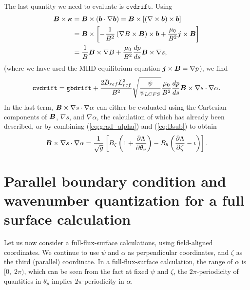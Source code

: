 \documentclass[11pt,letter]{article}
\newcommand{\vect}[1]{\mbox{\boldmath $#1$}}
\newcommand{\gbdrift}{\mathtt{gbdrift}}
\newcommand{\cvdrift}{\mathtt{cvdrift}}
\begin{document}
The last quantity we need to evaluate is $\cvdrift$. Using
\begin{align}
\vect{B}\times\vect{\kappa}
&= \vect{B}\times(\vect{b}\cdot\nabla \vect{b}) 
= \vect{B}\times \left[ (\nabla\times\vect{b}) \times\vect{b}\right] \nonumber \\
&= \vect{B} \times \left[ -\frac{1}{B^2} \left( \nabla B \times\vect{B}\right)\times\vect{b} + \frac{\mu_0}{B^2} \vect{j}\times\vect{B}\right] \nonumber \\
&= \frac{1}{B} \vect{B}\times\nabla B + \frac{\mu_0}{B^2} \frac{dp}{ds} \vect{B}\times\nabla s,
\end{align}
(where we have used the MHD equilibrium equation $\vect{j}\times\vect{B} = \nabla p$), we find
\begin{equation}
\cvdrift = \gbdrift 
+ \frac{2 B_{ref} L_{ref}^2}{B^2} \sqrt{\frac{\psi}{\psi_{LCFS}}} \frac{\mu_0}{B^2} \frac{dp}{ds} \vect{B}\times\nabla s \cdot \nabla \alpha.
\end{equation}
In the last term, $\vect{B}\times\nabla s \cdot \nabla \alpha$ can either
be evaluated using the Cartesian components of $\vect{B}$, $\nabla s$, and $\nabla \alpha$,
the calculation of which has already been described,
or by combining (\ref{eq:grad_alpha}) and (\ref{eq:Bsub}) to obtain
\begin{equation}
\vect{B}\times\nabla s \cdot \nabla \alpha
= \frac{1}{\sqrt{g}} \left[
B_\zeta \left( 1  + \frac{\partial\Lambda}{\partial\theta_v}\right)
-B_\theta \left( \frac{\partial\Lambda}{\partial\zeta} - \iota \right) \right].
\end{equation}




\section{Parallel boundary condition and wavenumber quantization for a full surface calculation}

Let us now consider a full-flux-surface calculations, using field-aligned coordinates. 
We continue to use $\psi$ and $\alpha$ as perpendicular coordinates, and $\zeta$ as the third (parallel) coordinate.
In a full-flux-surface calculation, the range of $\alpha$ is $[0,\; 2\pi)$,
which can be seen from the fact at fixed $\psi$ and $\zeta$, the $2\pi$-periodicity of quantities in
$\theta_p$ implies $2\pi$-periodicity in $\alpha$.
\end{document}
